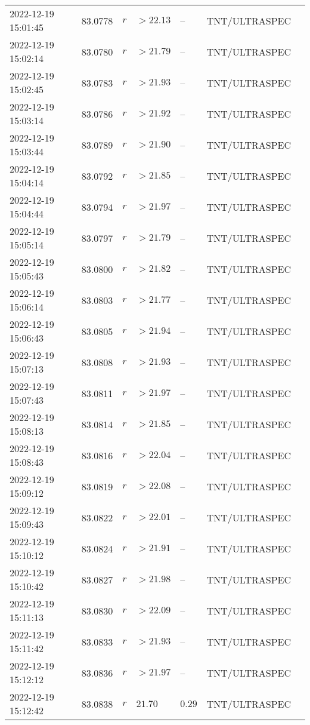\documentclass{nature_plusfigure}
\begin{document}
\begin{supplement}
\begin{center}
\begin{longtable}{lllllll}
2022-12-19 15:01:45 & 83.0778 & $r$ & $>22.13$ & -- & TNT/ULTRASPEC &  \\ 
2022-12-19 15:02:14 & 83.0780 & $r$ & $>21.79$ & -- & TNT/ULTRASPEC &  \\ 
2022-12-19 15:02:45 & 83.0783 & $r$ & $>21.93$ & -- & TNT/ULTRASPEC &  \\ 
2022-12-19 15:03:14 & 83.0786 & $r$ & $>21.92$ & -- & TNT/ULTRASPEC &  \\ 
2022-12-19 15:03:44 & 83.0789 & $r$ & $>21.90$ & -- & TNT/ULTRASPEC &  \\ 
2022-12-19 15:04:14 & 83.0792 & $r$ & $>21.85$ & -- & TNT/ULTRASPEC &  \\ 
2022-12-19 15:04:44 & 83.0794 & $r$ & $>21.97$ & -- & TNT/ULTRASPEC &  \\ 
2022-12-19 15:05:14 & 83.0797 & $r$ & $>21.79$ & -- & TNT/ULTRASPEC &  \\ 
2022-12-19 15:05:43 & 83.0800 & $r$ & $>21.82$ & -- & TNT/ULTRASPEC &  \\ 
2022-12-19 15:06:14 & 83.0803 & $r$ & $>21.77$ & -- & TNT/ULTRASPEC &  \\ 
2022-12-19 15:06:43 & 83.0805 & $r$ & $>21.94$ & -- & TNT/ULTRASPEC &  \\ 
2022-12-19 15:07:13 & 83.0808 & $r$ & $>21.93$ & -- & TNT/ULTRASPEC &  \\ 
2022-12-19 15:07:43 & 83.0811 & $r$ & $>21.97$ & -- & TNT/ULTRASPEC &  \\ 
2022-12-19 15:08:13 & 83.0814 & $r$ & $>21.85$ & -- & TNT/ULTRASPEC &  \\ 
2022-12-19 15:08:43 & 83.0816 & $r$ & $>22.04$ & -- & TNT/ULTRASPEC &  \\ 
2022-12-19 15:09:12 & 83.0819 & $r$ & $>22.08$ & -- & TNT/ULTRASPEC &  \\ 
2022-12-19 15:09:43 & 83.0822 & $r$ & $>22.01$ & -- & TNT/ULTRASPEC &  \\ 
2022-12-19 15:10:12 & 83.0824 & $r$ & $>21.91$ & -- & TNT/ULTRASPEC &  \\ 
2022-12-19 15:10:42 & 83.0827 & $r$ & $>21.98$ & -- & TNT/ULTRASPEC &  \\ 
2022-12-19 15:11:13 & 83.0830 & $r$ & $>22.09$ & -- & TNT/ULTRASPEC &  \\ 
2022-12-19 15:11:42 & 83.0833 & $r$ & $>21.93$ & -- & TNT/ULTRASPEC &  \\ 
2022-12-19 15:12:12 & 83.0836 & $r$ & $>21.97$ & -- & TNT/ULTRASPEC &  \\ 
2022-12-19 15:12:42 & 83.0838 & $r$ & $21.70$ & $0.29$ & TNT/ULTRASPEC &  \\ 

\end{longtable}
\end{center}
\end{supplement}
\end{document}
